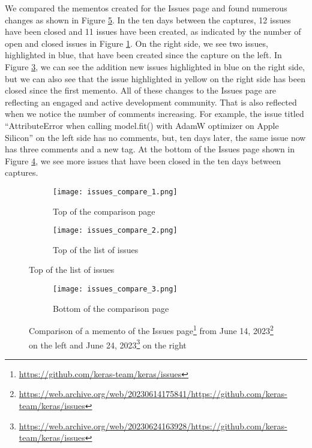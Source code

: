 We compared the mementos created for the Issues page and found numerous changes as shown in Figure \ref{fig:issues_compare}. In the ten days between the captures, 12 issues have been closed and 11 issues have been created, as indicated by the number of open and closed issues in Figure \ref{fig:issues_compare_1}. On the right side, we see two issues, highlighted in blue, that have been created since the capture on the left. In Figure \ref{fig:issues_compare_2}, we can see the addition new issues highlighted in blue on the right side, but we can also see that the issue highlighted in yellow on the right side has been closed since the first memento. All of these changes to the Issues page are reflecting an engaged and active development community. That is also reflected when we notice the number of comments increasing. For example, the issue titled ``AttributeError when calling model.fit() with AdamW optimizer on Apple Silicon''  on the left side has no comments, but, ten days later, the same issue now has three comments and a new tag. At the bottom of the Issues page shown in Figure \ref{fig:issues_compare_3}, we see more issues that have been closed in the ten days between captures.

\begin{figure}
    \begin{subfigure}{\textwidth}
        \centering
        \texttt{[image: issues\_compare\_1.png]} 
        \caption{Top of the comparison page}
        \label{fig:issues_compare_1}
    \end{subfigure}
    \begin{subfigure}{\textwidth}
        \centering
        \texttt{[image: issues\_compare\_2.png]}
        \caption{Top of the list of issues}
        \label{fig:issues_compare_2}
    \end{subfigure}
\end{figure} 

\begin{figure}
    \addtocounter{figure}{-1}
    \begin{subfigure}{\textwidth}
        \addtocounter{subfigure}{2}
        \centering
        \texttt{[image: issues\_compare\_3.png]} 
        \caption{Bottom of the comparison page}
        \label{fig:issues_compare_3}
    \end{subfigure}
    \caption[Comparing mementos of the Issues page]{Comparison of a memento of the Issues page\footnote{\url{https://github.com/keras-team/keras/issues}} from June 14, 2023\footnote{\url{https://web.archive.org/web/20230614175841/https://github.com/keras-team/keras/issues}} on the left and June 24, 2023\footnote{\url{https://web.archive.org/web/20230624163928/https://github.com/keras-team/keras/issues}} on the right}
    \label{fig:issues_compare}
\end{figure}

